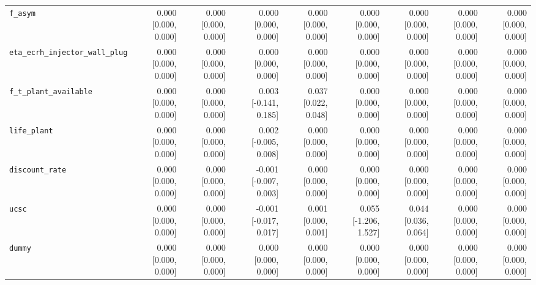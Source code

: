 \begin{tabular}{lrrrrrrrr}
\texttt{f\_asym} & 0.000 [0.000, 0.000] & 0.000 [0.000, 0.000] & 0.000 [0.000, 0.000] & 0.000 [0.000, 0.000] & 0.000 [0.000, 0.000] & 0.000 [0.000, 0.000] & 0.000 [0.000, 0.000] & 0.000 [0.000, 0.000] \\
\texttt{eta\_ecrh\_injector\_wall\_plug} & 0.000 [0.000, 0.000] & 0.000 [0.000, 0.000] & 0.000 [0.000, 0.000] & 0.000 [0.000, 0.000] & 0.000 [0.000, 0.000] & 0.000 [0.000, 0.000] & 0.000 [0.000, 0.000] & 0.000 [0.000, 0.000] \\
\texttt{f\_t\_plant\_available} & 0.000 [0.000, 0.000] & 0.000 [0.000, 0.000] & 0.003 [-0.141, 0.185] & 0.037 [0.022, 0.048] & 0.000 [0.000, 0.000] & 0.000 [0.000, 0.000] & 0.000 [0.000, 0.000] & 0.000 [0.000, 0.000] \\
\texttt{life\_plant} & 0.000 [0.000, 0.000] & 0.000 [0.000, 0.000] & 0.002 [-0.005, 0.008] & 0.000 [0.000, 0.000] & 0.000 [0.000, 0.000] & 0.000 [0.000, 0.000] & 0.000 [0.000, 0.000] & 0.000 [0.000, 0.000] \\
\texttt{discount\_rate} & 0.000 [0.000, 0.000] & 0.000 [0.000, 0.000] & -0.001 [-0.007, 0.003] & 0.000 [0.000, 0.000] & 0.000 [0.000, 0.000] & 0.000 [0.000, 0.000] & 0.000 [0.000, 0.000] & 0.000 [0.000, 0.000] \\
\texttt{ucsc} & 0.000 [0.000, 0.000] & 0.000 [0.000, 0.000] & -0.001 [-0.017, 0.017] & 0.001 [0.000, 0.001] & 0.055 [-1.206, 1.527] & 0.044 [0.036, 0.064] & 0.000 [0.000, 0.000] & 0.000 [0.000, 0.000] \\
\texttt{dummy} & 0.000 [0.000, 0.000] & 0.000 [0.000, 0.000] & 0.000 [0.000, 0.000] & 0.000 [0.000, 0.000] & 0.000 [0.000, 0.000] & 0.000 [0.000, 0.000] & 0.000 [0.000, 0.000] & 0.000 [0.000, 0.000] \\
\bottomrule
\end{tabular}
